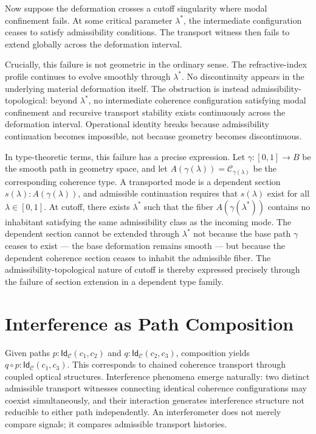 \documentclass[11pt,openany]{book}
\theoremstyle{definition}
\theoremstyle{plain}
\newcommand{\idtype}{\mathsf{Id}}
\begin{document}
Now suppose the deformation crosses a cutoff singularity where modal confinement fails. At some critical parameter $\lambda^\ast$, the intermediate configuration ceases to satisfy admissibility conditions. The transport witness then fails to extend globally across the deformation interval.

Crucially, this failure is not geometric in the ordinary sense. The refractive-index profile continues to evolve smoothly through $\lambda^\ast$. No discontinuity appears in the underlying material deformation itself. The obstruction is instead admissibility-topological: beyond $\lambda^\ast$, no intermediate coherence configuration satisfying modal confinement and recursive transport stability exists continuously across the deformation interval. Operational identity breaks because admissibility continuation becomes impossible, not because geometry becomes discontinuous.

In type-theoretic terms, this failure has a precise expression. Let $\gamma : [0,1] \to B$ be the smooth path in geometry space, and let $A(\gamma(\lambda)) = \mathcal{C}_{\gamma(\lambda)}$ be the corresponding coherence type. A transported mode is a dependent section $s(\lambda) : A(\gamma(\lambda))$, and admissible continuation requires that $s(\lambda)$ exist for all $\lambda \in [0,1]$. At cutoff, there exists $\lambda^\ast$ such that the fiber $A(\gamma(\lambda^\ast))$ contains no inhabitant satisfying the same admissibility class as the incoming mode. The dependent section cannot be extended through $\lambda^\ast$ not because the base path $\gamma$ ceases to exist --- the base deformation remains smooth --- but because the dependent coherence section ceases to inhabit the admissible fiber. The admissibility-topological nature of cutoff is thereby expressed precisely through the failure of section extension in a dependent type family.

\section{Interference as Path Composition}

Given paths $p : \idtype_{\mathcal{C}}(c_1,c_2)$ and $q : \idtype_{\mathcal{C}}(c_2,c_3)$, composition yields $q \circ p : \idtype_{\mathcal{C}}(c_1,c_3)$. This corresponds to chained coherence transport through coupled optical structures. Interference phenomena emerge naturally: two distinct admissible transport witnesses connecting identical coherence configurations may coexist simultaneously, and their interaction generates interference structure not reducible to either path independently. An interferometer does not merely compare signals; it compares admissible transport histories.
\end{document}
